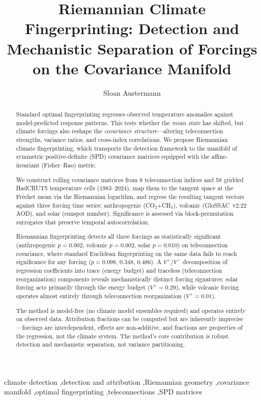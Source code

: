 \documentclass[preprint,12pt]{elsarticle}
\newcommand{\pval}{p}
\begin{document}
\onehalfspacing

\begin{frontmatter}

\title{Riemannian Climate Fingerprinting: Detection and Mechanistic Separation of Forcings on the Covariance Manifold}

\author{Sloan Austermann}
\address{OmniSciences LLC}

\begin{abstract}
Standard optimal fingerprinting \citep{Hasselmann1979,AllenStott2003} regresses observed temperature anomalies against model-predicted response patterns.
This tests whether the \emph{mean state} has shifted, but climate forcings also reshape the \emph{covariance structure}---altering teleconnection strengths, variance ratios, and cross-index correlations.
We propose Riemannian climate fingerprinting, which transports the detection framework to the manifold of symmetric positive-definite (SPD) covariance matrices equipped with the affine-invariant (Fisher--Rao) metric.

We construct rolling covariance matrices from 8 teleconnection indices and 58 gridded HadCRUT5 temperature cells (1983--2024), map them to the tangent space at the Fr\'{e}chet mean via the Riemannian logarithm, and regress the resulting tangent vectors against three forcing time series: anthropogenic (CO$_2$+CH$_4$), volcanic (GloSSAC~v2.22 AOD), and solar (sunspot number).
Significance is assessed via block-permutation surrogates that preserve temporal autocorrelation.

Riemannian fingerprinting detects all three forcings as statistically significant (anthropogenic $\pval=0.002$, volcanic $\pval=0.002$, solar $\pval=0.010$) on teleconnection covariance, where standard Euclidean fingerprinting on the same data fails to reach significance for any forcing ($\pval=0.098$, $0.348$, $0.486$).
A $V^+/V^-$ decomposition of regression coefficients into trace (energy budget) and traceless (teleconnection reorganization) components reveals mechanistically distinct forcing signatures: solar forcing acts primarily through the energy budget ($V^+=0.29$), while volcanic forcing operates almost entirely through teleconnection reorganization ($V^+=0.01$).

The method is model-free (no climate model ensembles required) and operates entirely on observed data.
Attribution fractions can be computed but are inherently imprecise---forcings are interdependent, effects are non-additive, and fractions are properties of the regression, not the climate system.
The method's core contribution is robust detection and mechanistic separation, not variance partitioning.
\end{abstract}

\begin{keyword}
climate detection \sep detection and attribution \sep Riemannian geometry \sep covariance manifold \sep optimal fingerprinting \sep teleconnections \sep SPD matrices
\end{keyword}

\end{frontmatter}
\end{document}

